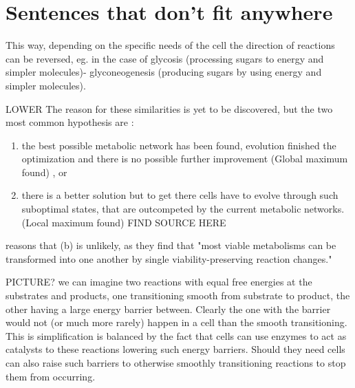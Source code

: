 \documentclass[10pt,a4paper]{article}
\begin{document}
\section{Sentences that don't fit anywhere}
\label{sec:sentences_that_don_t_fit_anywhere}

This way, depending on the specific needs of the cell the direction of reactions can be reversed, eg. in the case of glycosis (processing sugars to energy and simpler molecules)- glyconeogenesis (producing sugars by using energy and simpler molecules).


	LOWER The reason for these similarities is yet to be discovered, but the two most common hypothesis  are : 
	\begin{enumerate}[label=(\alph*)]
	\item the best possible metabolic network has been found, evolution finished the optimization and there is no possible further improvement (Global maximum found) \cite{theoretical} \cite{latent} \cite{strategy}, or 
	\item there is a better solution but to get there cells have to evolve through such suboptimal states, that are outcompeted by the current metabolic networks. (Local maximum found) FIND SOURCE HERE
	\end{enumerate} 
	 \cite{historical} reasons that (b) is unlikely, as they find that  "most viable metabolisms can be transformed into one another by single viability-preserving reaction changes."  
	
	PICTURE? we can imagine two reactions with equal free energies at the substrates and products, one transitioning smooth from substrate to product, the other having a large energy barrier between. Clearly the one with the barrier would not (or much more rarely) happen in a cell than the smooth transitioning. This is simplification is balanced by the fact that cells can use enzymes to act as catalysts to these reactions lowering such energy barriers. Should they need cells can also raise such barriers to otherwise smoothly transitioning reactions to stop them from occurring. 



	
	
\end{document}
